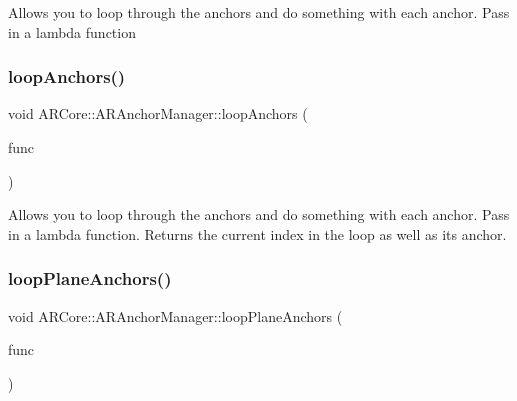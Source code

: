 Allows you to loop through the anchors and do something with each anchor. Pass in a lambda function \mbox{\label{class_a_r_core_1_1_a_r_anchor_manager_a03ee4092b5d958f8b1467e0a0e62f9b9}} 
\subsubsection{\texorpdfstring{loop\+Anchors()}{loopAnchors()}\hspace{0.1cm}{\footnotesize\ttfamily [2/2]}}
{\footnotesize\ttfamily void A\+R\+Core\+::\+A\+R\+Anchor\+Manager\+::loop\+Anchors (\begin{DoxyParamCaption}\item[{std\+::function$<$ void(\hyperlink{struct_a_r_objects_1_1_a_r_object}{A\+R\+Object}, int index)$>$}]{func }\end{DoxyParamCaption})}

Allows you to loop through the anchors and do something with each anchor. Pass in a lambda function. Returns the current index in the loop as well as it\textquotesingle{}s anchor. \mbox{\label{class_a_r_core_1_1_a_r_anchor_manager_a170e30f7226b84eaede22392f08d5521}} 
\subsubsection{\texorpdfstring{loop\+Plane\+Anchors()}{loopPlaneAnchors()}\hspace{0.1cm}{\footnotesize\ttfamily [1/2]}}
{\footnotesize\ttfamily void A\+R\+Core\+::\+A\+R\+Anchor\+Manager\+::loop\+Plane\+Anchors (\begin{DoxyParamCaption}\item[{std\+::function$<$ void(\hyperlink{struct_a_r_objects_1_1_plane_anchor_object}{Plane\+Anchor\+Object})$>$}]{func }\end{DoxyParamCaption})}




